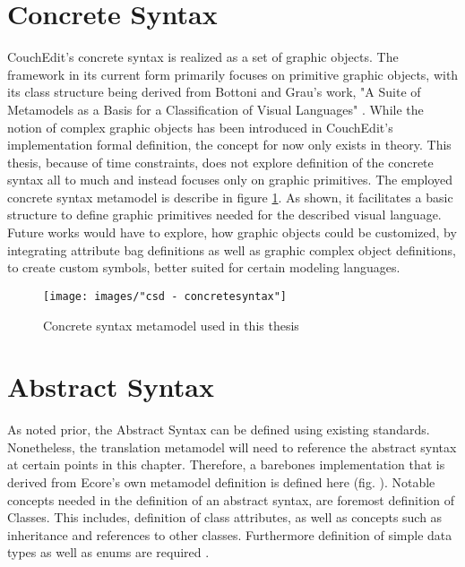 \section{Concrete Syntax}
CouchEdit's concrete syntax is realized as a set of graphic objects. The framework in its current form primarily focuses on primitive graphic objects, with its class structure being derived \cite[p.39]{nachreiner_couchedit_2020} from Bottoni and Grau's work, "A Suite of Metamodels as a Basis for a Classification of Visual Languages"  \cite{bottoni_suite_2004}. While the notion of complex graphic objects has been introduced in CouchEdit's implementation formal definition, the concept for now only exists in theory. This thesis, because of time constraints, does not explore definition of the concrete syntax all to much and instead focuses only on graphic primitives. The employed concrete syntax metamodel is describe in figure \ref{fig:concretesyntax}. As shown, it facilitates a basic structure to define graphic primitives needed for the described visual language. Future works would have to explore, how graphic objects could be customized, by integrating attribute bag definitions as well as graphic complex object definitions, to create custom symbols, better suited for certain modeling languages.

\begin{figure}
\centering
\texttt{[image: images/"csd - concretesyntax"]}
\caption{Concrete syntax metamodel used in this thesis}
\label{fig:concretesyntax}
\end{figure}


\section{Abstract Syntax}
As noted prior, the Abstract Syntax can be defined using existing standards. Nonetheless, the translation metamodel will need to reference the abstract syntax at certain points in this chapter. Therefore, a barebones implementation that is derived from Ecore's own metamodel  definition is defined here (fig. ). Notable concepts needed in the definition of an abstract syntax, are foremost definition of Classes. This includes, definition of class attributes, as well as concepts such as inheritance and references to other classes. Furthermore definition of simple data types as well as enums are required .  

